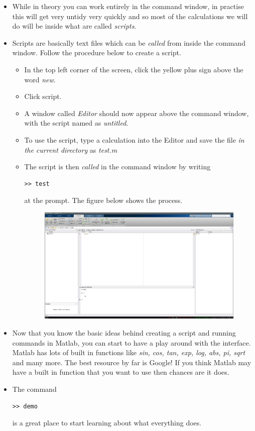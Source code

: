 \documentclass[12pt]{report}
\begin{document}
\begin{itemize}
\begin{figure}[h]
    \caption*{}
\end{figure}
\item While in theory you can work entirely in the command window, in practise this will get very untidy very quickly and so most of the calculations we will do will be inside what are called \textit{scripts}.
\item Scripts are basically text files which can be \textit{called} from inside the command window. Follow the procedure below to create a script.
\begin{itemize}
\item In the top left corner of the screen, click the yellow plus sign above the word \textit{new}.
\item Click script.
\item A window called \textit{Editor} should now appear above the command window, with the script named as \textit{untitled}.
\item To use the script, type a calculation into the Editor and save the file \textit{in the current directory} as \textit{test.m}
\item The script is then \textit{called} in the command window by writing 
\begin{lstlisting}
>> test
\end{lstlisting} 
at the prompt. The figure below shows the process.
\begin{figure}[h]		
	\centering
	\includegraphics[width=1\textwidth]{matlabscript.png} 
    \caption*{}
\end{figure}
\end{itemize}
\item Now that you know the basic ideas behind creating a script and running commands in Matlab, you can start to have a play around with the interface. Matlab has lots of built in functions like \textit{sin, cos, tan, exp, log, abs, pi, sqrt} and many more. The best resource by far is Google! If you think Matlab may have a built in function that you want to use then chances are it does.
\item The command 
\begin{lstlisting}
>> demo
\end{lstlisting} 
is a great place to start learning about what everything does.
\end{itemize}
\end{document}
